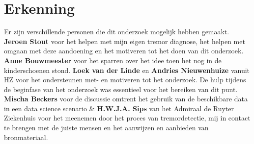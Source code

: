 \section*{Erkenning}
Er zijn verschillende personen die dit onderzoek mogelijk hebben gemaakt.
\textbf{Jeroen Stout} voor het helpen met mijn eigen tremor diagnose, 
het helpen met omgaan met deze aandoening en het motiveren tot het doen van dit onderzoek.
\textbf{Anne Bouwmeester} voor het sparren over het idee toen het nog in de kinderschoenen stond.
\textbf{Loek van der Linde} en \textbf{Andries Nieuwenhuize} vanuit HZ voor het ondersteunen met- en motiveren tot het onderzoek.
De hulp tijdens de beginfase van het onderzoek was essentieel voor het bereiken van dit punt.
\textbf{Mischa Beckers} voor de discussie omtrent het gebruik van de beschikbare data in een data science scenario \&
\textbf{H.W.J.A. Sips} van het Admiraal de Ruyter Ziekenhuis voor het meenemen door het proces van tremordetectie,
mij in contact te brengen met de juiste mensen en het aanwijzen en aanbieden van bronmateriaal.